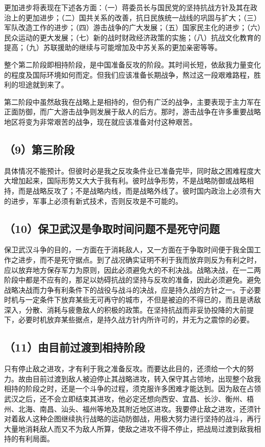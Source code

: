更加进步将表现在下述各方面：（一）蒋委员长与国民党的坚持抗战方针及其在政治上的更加进步；（二）国共关系的改善，抗日民族统一战线的巩固与扩大；（三）军队改造工作的进步；（四）游击战争的广大发展；（五）国家民主化的进步；（六）民众运动的更大发展；（七）新的战时财政经济政策的实施；（八）抗战文化教育的提高；（九）苏联援助的继续与可能增加及中苏关系的更加亲密等等。

整个第二阶段即相持阶段，是中国准备反攻的阶段。其时间长短，依敌我力量变化的程度及国际环境如何而定。但我们应该准备长期战争，熬过这一段艰难路程，胜利的坦途就到来了。

第二阶段中虽然敌我在战略上是相持的，但仍有广泛的战争，主要表现于主力军在正面防御，而广大游击战争则发展于敌人的后方。那时，游击战争在许多重要战略地区将变为非常艰苦的战争，现在就应该准备对付这种艰苦。

\subsection{（9）第三阶段}

具体情况不能预计。但彼时必是我之反攻条件业已准备完毕，同时敌之困难程度大大增加起来，国际形势又大大于我有利。彼时战争形势，不是战略防御或战略相持，而是战略反攻了；不是战略内线，而是战略外线了。彼时国内政治上必须有大的进步，军事上必须有新式技术，否则反攻是不可能的。

\subsection{（10）保卫武汉是争取时间问题不是死守问题}

保卫武汉斗争的目的，一方面在于消耗敌人，又一方面在于争取时间便于我全国工作之进步，而不是死守据点。到了战况确实证明不利于我而放弃则反为有利之时，应以放弃地方保存军力为原则，因此必须避免大的不利决战。战略决战，在一二两阶段中都是不应有的，那足以妨碍抗战的坚持与反攻的准备，因此必须避免。避免战略决战而力争有利条件下的战役与战斗的决战，应是持久战的方针之一。于必要时机与一定条件下放弃某些无可再守的城市，不但是被迫的不得已的，而且是诱敌深入，分散、消耗与疲惫敌人的积极的政策。在坚持抗战而非妥协投降的大前提下，必要时机放弃某些据点，是持久战方针内所许可的，并无为之震惊的必要。

\subsection{（11）由目前过渡到相持阶段}

只有停止敌之进攻，才有利于我之准备反攻。而要达此目的，还须给一个大的努力。故由目前过渡到敌人被迫停止其战略进攻，转入保守其占领地，出现整个敌我相持的阶段之时，还是一个斗争的过程，须克服许多困难才能达到。因为敌在占领武汉之后，还不会立即结束其进攻，他必定还想向西安、宜昌、长沙、衡州、梧州、北海、南昌、汕头、福州等地及其附近地区进攻。我要停止敌之进攻，还须针对着敌人这种企图继续执行战略的运动防御战，用极大努力进行坚持的战斗，再行大量地消耗敌人而又不为敌人所算，使敌之进攻不得不停止，把战局过渡到敌我相持的有利局面。

